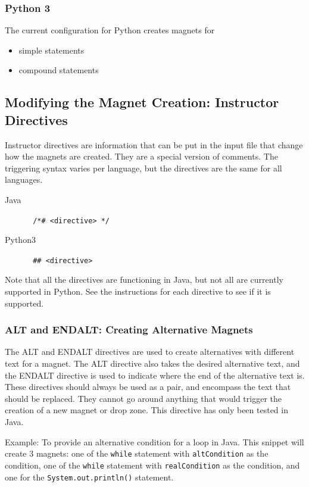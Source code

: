 \documentclass[letter,10pt,final]{article}
\begin{document}
\subsubsection{Python 3}
The current configuration for Python creates magnets for
\begin{itemize}
 \item simple statements
 \item compound statements
\end{itemize}


\subsection{Modifying the Magnet Creation: Instructor Directives}
Instructor directives are information that can be put in the input file 
that change how the magnets are created. They are a special version of 
comments. The triggering syntax varies per language, but the directives 
are the same for all languages.

\begin{description}
 \item [Java] \verb~ /*# <directive> */~
 \item [Python3] \verb~ ## <directive>~
\end{description}

Note that all the directives are functioning in Java, but not all are 
currently supported in Python. See the instructions for each directive 
to see if it is supported.

\subsubsection{ALT and ENDALT: Creating Alternative Magnets}

The ALT and ENDALT directives are used to create alternatives with 
different text for a magnet. The ALT directive also takes the desired 
alternative text, and the ENDALT directive is used to indicate where 
the end of the alternative text is. These directives should always be 
used as a pair, and encompass the text that should be replaced. They 
cannot go around anything that would trigger the creation of a new 
magnet or drop zone. This directive has only been tested in 
Java.  

Example: To provide an alternative condition for a loop in Java. This 
snippet will create 3 magnets: one of the \verb~while~ statement with 
\verb~altCondition~ as the condition, one of the \verb~while~ statement 
with \verb~realCondition~ as the condition, and one for the 
\verb~System.out.println()~ statement.
\end{document}
